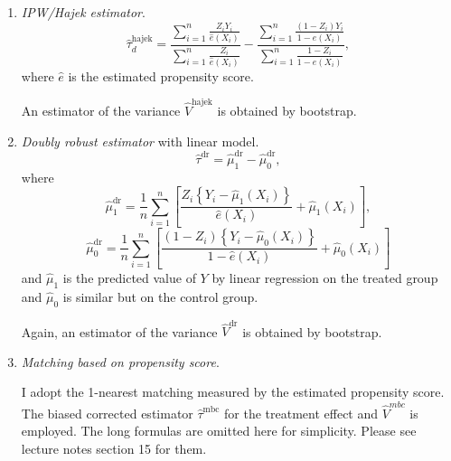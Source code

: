 \documentclass[11pt]{article}
\begin{document}
\begin{enumerate}
    \item \textit{IPW/Hajek estimator}.
        \[
            \hat{\tau}_d^{\text {hajek}}=\frac{\sum_{i=1}^{n} \frac{Z_{i} Y_{i}}{\hat{e}\left(X_{i}\right)}}{\sum_{i=1}^{n} \frac{Z_{i}}{\hat{e}\left(X_{i}\right)}}-\frac{\sum_{i=1}^{n} \frac{\left(1-Z_{i}\right) Y_{i}}{1-\hat{e}\left(X_{i}\right)}}{\sum_{i=1}^{n} \frac{1-Z_{i}}{1-\hat{e}\left(X_{i}\right)}},
        \]
        where $\hat e$ is the estimated propensity score.

        An estimator of the variance $\hat V^{\text{hajek}}$ is obtained by bootstrap.
    \item \textit{Doubly robust estimator} with linear model.
        \[ \hat{\tau}^{\mathrm{dr}}=\hat{\mu}_{1}^{\mathrm{dr}}-\hat{\mu}_{0}^{\mathrm{dr}}, \]
        where
        \[
            \hat{\mu}_{1}^{\mathrm{dr}}=\frac{1}{n} \sum_{i=1}^{n}\left[\frac{Z_{i}\left\{Y_{i}-\hat \mu_{1}\left(X_{i}\right)\right\}}{\hat e\left(X_{i}\right)}+\hat \mu_{1}\left(X_{i}\right)\right],
        \]
        \[
            \hat{\mu}_{0}^{\mathrm{dr}}=\frac{1}{n} \sum_{i=1}^{n}\left[\frac{\left(1-Z_{i}\right)\left\{Y_{i}-\hat \mu_{0}\left(X_{i}\right)\right\}}{1- \hat e\left(X_{i}\right)} + \hat \mu_{0}\left(X_{i}\right)\right]
        \]
        and $\hat \mu_1$ is the predicted value of $Y$ by linear regression on the treated group and $\hat \mu_0$ is similar but on the control group.

        Again, an estimator of the variance $\hat V^{\text{dr}}$ is obtained by bootstrap.
    \item \textit{Matching based on propensity score}.
       
        I adopt the 1-nearest matching measured by the estimated propensity score. The biased corrected estimator $\hat \tau^{\text{mbc}}$ for the treatment effect and $\hat V^{mbc}$ is employed. The long formulas are omitted here for simplicity. Please see lecture notes section 15 for them.
\end{enumerate}
\end{document}
